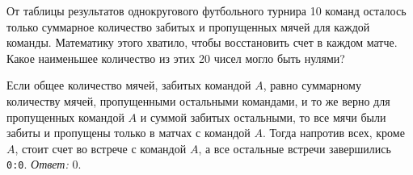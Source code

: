 От таблицы результатов однокругового футбольного турнира 10 команд осталось
только суммарное количество забитых и пропущенных мячей для каждой команды.
Математику этого хватило, чтобы восстановить счет в каждом матче.
Какое наименьшее количество из этих 20 чисел могло быть нулями?

\solution
Если общее количество мячей, забитых командой $A$, равно суммарному количеству
мячей, пропущенными остальными командами, и то же верно для пропущенных
командой $A$ и суммой забитых остальными, то все мячи были забиты и пропущены
только в матчах с командой $A$.
Тогда напротив всех, кроме $A$, стоит счет во встрече с командой $A$, а все
остальные встречи завершились \texttt{0:0}.
\emph{Ответ:} 0.

